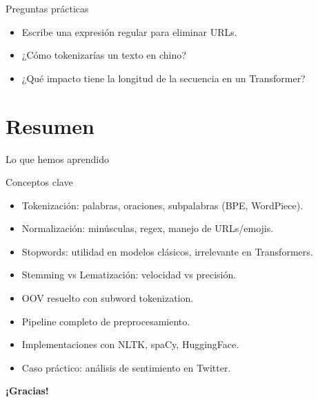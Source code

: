 \documentclass[aspectratio=169, 10pt, xcolor=table]{beamer}
\begin{document}
\begin{frame}{Preguntas prácticas}
    \begin{itemize}
        \item Escribe una expresión regular para eliminar URLs.
        \item ¿Cómo tokenizarías un texto en chino?
        \item ¿Qué impacto tiene la longitud de la secuencia en un Transformer?
    \end{itemize}
\end{frame}

\section{Resumen}

\begin{frame}{Lo que hemos aprendido}
    \begin{exampleblock}{Conceptos clave}
        \begin{itemize}
            \item Tokenización: palabras, oraciones, subpalabras (BPE, WordPiece).
            \item Normalización: minúsculas, regex, manejo de URLs/emojis.
            \item Stopwords: utilidad en modelos clásicos, irrelevante en Transformers.
            \item Stemming vs Lematización: velocidad vs precisión.
            \item OOV resuelto con subword tokenization.
            \item Pipeline completo de preprocesamiento.
            \item Implementaciones con NLTK, spaCy, HuggingFace.
            \item Caso práctico: análisis de sentimiento en Twitter.
        \end{itemize}
    \end{exampleblock}
\end{frame}

\begin{frame}
    \centering
    \Huge \textbf{¡Gracias!}

\end{frame}
\end{document}
